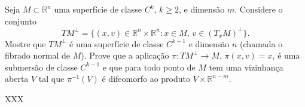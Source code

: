 \begin{homeworkProblem}
  Seja $M \subset \mathbb{R}^n$ uma superfície de classe $C^k$, $k \geq 2$, e dimensão $m$. Considere o conjunto
    \[
    TM^\perp = \{(x,v) \in \mathbb{R}^n \times \mathbb{R}^n : x \in M, \, v \in (T_x M)^\perp\}.
    \]
    Mostre que $TM^\perp$ é uma superfície de classe $C^{k-1}$ e dimensão $n$ (chamada o fibrado normal de $M$). Prove que a aplicação $\pi : TM^\perp \to M$, $\pi(x,v)=x$, é uma submersão de classe $C^{k-1}$ e que para todo ponto de $M$ tem uma vizinhança aberta $V$ tal que $\pi^{-1}(V)$ é difeomorfo ao produto $V \times \mathbb{R}^{n-m}$.
  \begin{solution}
    XXX  
  \end{solution}
\end{homeworkProblem}
